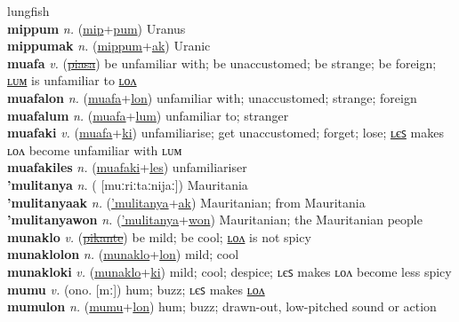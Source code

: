 lungfish \label{mippes} \\
\textbf{mippum} \textit{n.} (\hyperref[mip]{mip}+\hyperref[pum]{pum})
Uranus \label{mippum} \\
\textbf{mippumak} \textit{n.} (\hyperref[mippum]{mippum}+\hyperref[ak]{ak})
Uranic \label{mippumak} \\
\textbf{muafa} \textit{v.} (\hyperref[piasa]{\sout{piasa}})
be unfamiliar with; be unaccustomed; be strange; be foreign; \hyperref[muafalum]{ʟᴜᴍ} is unfamiliar to \hyperref[muafalon]{ʟᴏᴧ} \label{muafa} \\
\textbf{muafalon} \textit{n.} (\hyperref[muafa]{muafa}+\hyperref[lon]{lon})
unfamiliar with; unaccustomed; strange; foreign \label{muafalon} \\
\textbf{muafalum} \textit{n.} (\hyperref[muafa]{muafa}+\hyperref[lum]{lum})
unfamiliar to; stranger \label{muafalum} \\
\textbf{muafaki} \textit{v.} (\hyperref[muafa]{muafa}+\hyperref[ki]{ki})
unfamiliarise; get unaccustomed; forget; lose; \hyperref[muafakiles]{ʟєꜱ} makes ʟᴏᴧ become unfamiliar with ʟᴜᴍ \label{muafaki} \\
\textbf{muafakiles} \textit{n.} (\hyperref[muafaki]{muafaki}+\hyperref[les]{les})
unfamiliariser \label{muafakiles} \\
\textbf{'mulitanya} \textit{n.} ( [muːriːtaːnijaː])
Mauritania \label{'mulitanya} \\
\textbf{'mulitanyaak} \textit{n.} (\hyperref['mulitanya]{'mulitanya}+\hyperref[ak]{ak})
Mauritanian; from Mauritania \label{'mulitanyaak} \\
\textbf{'mulitanyawon} \textit{n.} (\hyperref['mulitanya]{'mulitanya}+\hyperref[won]{won})
Mauritanian; the Mauritanian people \label{'mulitanyawon} \\
\textbf{munaklo} \textit{v.} (\hyperref[pikante]{\sout{pikante}})
be mild; be cool; \hyperref[munaklolon]{ʟᴏᴧ} is not spicy \label{munaklo} \\
\textbf{munaklolon} \textit{n.} (\hyperref[munaklo]{munaklo}+\hyperref[lon]{lon})
mild; cool \label{munaklolon} \\
\textbf{munakloki} \textit{v.} (\hyperref[munaklo]{munaklo}+\hyperref[ki]{ki})
mild; cool; despice; ʟєꜱ makes ʟᴏᴧ become less spicy \label{munakloki} \\
\textbf{mumu} \textit{v.} (ono. [mː])
hum; buzz; ʟєꜱ makes \hyperref[mumulon]{ʟᴏᴧ} \label{mumu} \\
\textbf{mumulon} \textit{n.} (\hyperref[mumu]{mumu}+\hyperref[lon]{lon})
hum; buzz; drawn-out, low-pitched sound or action \label{mumulon} \\
